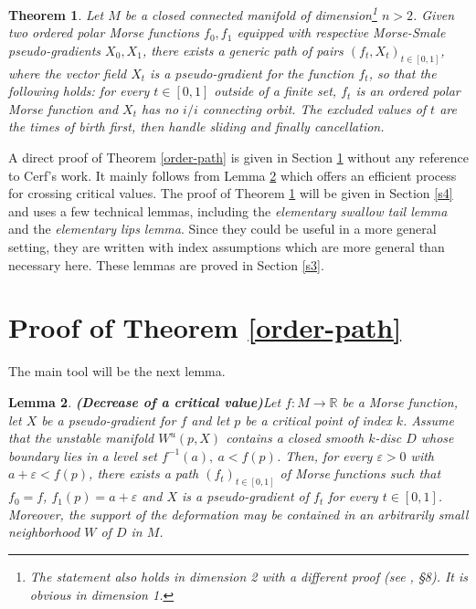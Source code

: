 \documentclass[12pt]{amsart}
\newtheorem{thm}{Theorem}[section]
\newtheorem{lemme}[thm]{Lemma}
\def\R{\mathbb{R}}
\def\ep{\varepsilon}
\begin{document}
\begin{thm}\label{ord-f} Let $M$ be a closed connected manifold of dimension\footnote{The statement
also holds in dimension 2 with a different proof (see \cite{kudry}, \S 8).  It is obvious in dimension 1.} $n>2$.
Given two ordered polar  Morse functions $f_0,f_1$ equipped with respective Morse-Smale 
pseudo-gradients $X_0,X_1$, there exists 
a generic path of pairs $(f_t,X_t)_{t\in[0,1]}$, where the vector field 
$X_t $ is a pseudo-gradient for the function
$f_t$, so that the following holds:
for every $t\in [0,1]$ outside of  a finite set, %
 $f_t$ is an ordered  polar Morse function and $X_t$ has no $i/i$ connecting orbit. 
 The excluded values of $t$ are the times of birth first, then handle sliding and finally cancellation.
\end{thm}

A direct  proof of Theorem \ref{order-path} is given in Section \ref{s2} without any reference to Cerf's work.
It mainly follows  from  Lemma \ref{reorder} which offers an efficient process
for crossing critical values. 
The proof of Theorem  
 \ref{ord-f} will be given in Section \ref{s4} and  uses a few
  technical lemmas, including the {\it elementary swallow tail lemma} and the {\it elementary lips lemma}.
  Since they could be useful in a more general setting, they are written with index assumptions which are 
  more 
  general than necessary here. These lemmas are proved in Section \ref{s3}.
  
  \section{Proof of Theorem \ref{order-path}} \label{s2}
  
  The main tool will be the next lemma.

\begin{lemme} {\bf (Decrease of a critical value)}\label{reorder}
 Let $f:M\to \R$ be a Morse function, let $X$ be a pseudo-gradient
for $f$ and let $p$ be  a critical point of index $k$.
Assume  that the unstable manifold $W^u(p,X)$ contains a closed smooth $k$-disc
$D$ %
whose boundary lies in a level set $f^{-1}(a),\ a<f(p)$. 
Then, %
for every $\ep>0$ with $a+\ep<f(p)$,
 there exists a path  $(f_t)_{t\in[0,1]}$ of Morse functions such that
$f_0=f$, $f_1(p)=a+\ep$ and $X$ is a pseudo-gradient of $f_t$ for every 
$t\in[0,1]$. Moreover, the support of the deformation may be contained 
in an arbitrarily small neighborhood $W$ of  $D$ in $M$. %
\end{lemme}
 
\end{document}
